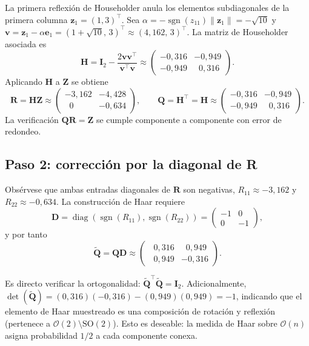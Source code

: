 \documentclass[11pt,letterpaper]{article}
\DeclareMathOperator{\diag}{diag}
\DeclareMathOperator{\sgn}{sgn}
\begin{document}
La primera reflexión de Householder anula los elementos subdiagonales de la primera columna $\bm{z}_1 = (1, 3)^\top$. Sea $\alpha = -\sgn(z_{11})\|\bm{z}_1\| = -\sqrt{10}$ y $\bm{v} = \bm{z}_1 - \alpha \bm{e}_1 = (1+\sqrt{10},\,3)^\top \approx (4{,}162,\,3)^\top$. La matriz de Householder asociada es
\begin{equation}
\bm{H} = \bm{I}_2 - \frac{2\bm{v}\bm{v}^\top}{\bm{v}^\top\bm{v}}
\approx
\begin{pmatrix} -0{,}316 & -0{,}949 \\ -0{,}949 & \;\;0{,}316 \end{pmatrix}.
\end{equation}
Aplicando $\bm{H}$ a $\bm{Z}$ se obtiene
\begin{equation}
\bm{R} = \bm{H}\bm{Z}
\approx
\begin{pmatrix} -3{,}162 & -4{,}428 \\ \;\;0 & -0{,}634 \end{pmatrix},
\qquad
\bm{Q} = \bm{H}^\top = \bm{H}
\approx
\begin{pmatrix} -0{,}316 & -0{,}949 \\ -0{,}949 & \;\;0{,}316 \end{pmatrix}.
\end{equation}
La verificación $\bm{Q}\bm{R} = \bm{Z}$ se cumple componente a componente con error de redondeo.

\subsection{Paso 2: corrección por la diagonal de R}

Obsérvese que ambas entradas diagonales de $\bm{R}$ son negativas, $R_{11}\approx -3{,}162$ y $R_{22}\approx -0{,}634$. La construcción de Haar requiere
\begin{equation}
\bm{D} = \diag(\sgn(R_{11}), \sgn(R_{22})) = \begin{pmatrix} -1 & 0 \\ 0 & -1 \end{pmatrix},
\end{equation}
y por tanto
\begin{equation}
\tilde{\bm{Q}} = \bm{Q}\bm{D} \approx
\begin{pmatrix} \;\;0{,}316 & \;\;0{,}949 \\ \;\;0{,}949 & -0{,}316 \end{pmatrix}.
\end{equation}

Es directo verificar la ortogonalidad: $\tilde{\bm{Q}}^\top \tilde{\bm{Q}} = \bm{I}_2$. Adicionalmente, $\det(\tilde{\bm{Q}}) = (0{,}316)(-0{,}316) - (0{,}949)(0{,}949) = -1$, indicando que el elemento de Haar muestreado es una composición de rotación y reflexión (pertenece a $\mathcal{O}(2)\setminus\mathrm{SO}(2)$). Esto es deseable: la medida de Haar sobre $\mathcal{O}(n)$ asigna probabilidad $1/2$ a cada componente conexa.
\end{document}
